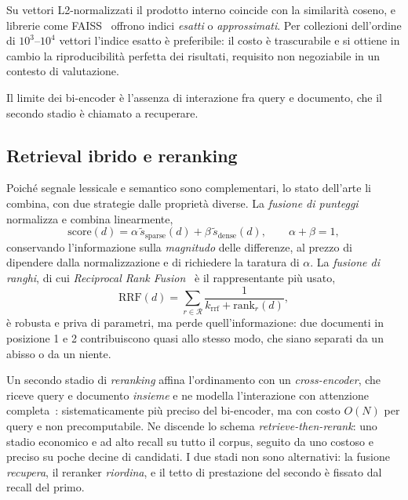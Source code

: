 \documentclass[11pt,a4paper]{report}
\begin{document}
Su vettori L2-normalizzati il prodotto interno coincide con la similarità coseno, e librerie
come FAISS~\cite{faiss} offrono indici \emph{esatti} o \emph{approssimati}. Per collezioni
dell'ordine di $10^3$--$10^4$ vettori l'indice esatto è preferibile: il costo è trascurabile e
si ottiene in cambio la riproducibilità perfetta dei risultati, requisito non negoziabile in
un contesto di valutazione.

Il limite dei bi-encoder è l'assenza di interazione fra query e documento, che il secondo
stadio è chiamato a recuperare.

\subsection{Retrieval ibrido e reranking}
Poiché segnale lessicale e semantico sono complementari, lo stato dell'arte li combina, con due
strategie dalle proprietà diverse. La \emph{fusione di punteggi} normalizza e combina
linearmente,
\begin{equation}\label{eq:fusion}
\text{score}(d) = \alpha\,\widetilde{s}_{\text{sparse}}(d) + \beta\,\widetilde{s}_{\text{dense}}(d),
\qquad \alpha + \beta = 1,
\end{equation}
conservando l'informazione sulla \emph{magnitudo} delle differenze, al prezzo di dipendere
dalla normalizzazione e di richiedere la taratura di $\alpha$. La \emph{fusione di ranghi}, di
cui \emph{Reciprocal Rank Fusion}~\cite{rrf} è il rappresentante più usato,
\begin{equation}\label{eq:rrf}
\text{RRF}(d) = \sum_{r \in \mathcal{R}} \frac{1}{k_{\text{rrf}} + \text{rank}_r(d)},
\end{equation}
è robusta e priva di parametri, ma perde quell'informazione: due documenti in posizione 1 e 2
contribuiscono quasi allo stesso modo, che siano separati da un abisso o da un niente.

Un secondo stadio di \emph{reranking} affina l'ordinamento con un \emph{cross-encoder}, che
riceve query e documento \emph{insieme} e ne modella l'interazione con attenzione
completa~\cite{sbert}: sistematicamente più preciso del bi-encoder, ma con costo $O(N)$ per
query e non precomputabile. Ne discende lo schema \emph{retrieve-then-rerank}: uno stadio
economico e ad alto recall su tutto il corpus, seguito da uno costoso e preciso su poche
decine di candidati. I due stadi non sono alternativi: la fusione \emph{recupera}, il reranker
\emph{riordina}, e il tetto di prestazione del secondo è fissato dal recall del primo.
\end{document}
